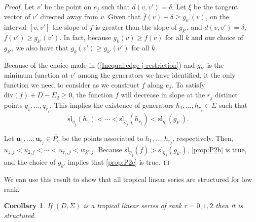 \documentclass{amsart}
\newtheorem{corollary}[theorem]{Corollary}
\begin{document}
\begin{proof}
		Let $v'$ be the point on $e_j$ such that $d(v,v') = \delta$. Let $\xi$ be the tangent vector of $v'$ directed away from $v$. Given that $\overline{f}(v) + \delta \geq g_{k'}(v)$, on the interval $[v,v']$ the slope of $\overline{f}$ is greater than the slope of $g_{k'}$, and $d(v,v') = \delta$, $\overline{f}(v') \geq g_{k'}(v')$. In fact, because $g_{k}(v) \geq \overline{f}(v)$ for all $k$ and our choice of $g_{k'}$, we also have that $g_{k}(v') \geq g_{k'}(v')$ for all $k$.
		
		Because of the choice made in (\ref{Inequal:edge-j-restriction}) and $g_{k'}$ is the minimum function at $v'$ among the generators we have identified, it the only function we need to consider as we construct $f$ along $e_j$. To satisfy $\mathrm{div}(f) + D - E_2 \geq 0$, the function $f$ will decrease in slope at the $r_j$ distinct points $q_1, \ldots, q_{r_j}$. This implies the existence of generators $h_1, \ldots, h_{r_j} \in \Sigma$ such that $$\mathrm{sl}_{\eta_j}(h_1) < \cdots < \mathrm{sl}_{\eta_j}(h_{r_j}) < \mathrm{sl}_{\eta_j}(g_{k'}).$$
		
		Let $\mathbf{u}_1, \ldots, \mathbf{u}_{r_j} \in \overline{P_v}$ be the points associated to $h_1, \ldots, h_{r_j}$, respectively. Then, $u_{1,j} < u_{2,j} < \cdots < u_{r_j, j} < w_{k',j}$. Because $\mathrm{sl}_{\eta_j}(\overline{f}) > \mathrm{sl}_{\eta_j}(g_{k'})$, \ref{prop:P2b} is true, and the choice of $g_{k'}$ implies that \ref{prop:P2c} is true.
	\end{proof}
	
	We can use this result to show that all tropical linear series are structured for low rank.
	
	\begin{corollary}
		\label{Cor:tls-structured-for-small-rank}
		If $(D, \Sigma)$ is a tropical linear series of rank $r = 0,1,2$ then it is structured.
	\end{corollary}
	
\end{document}
